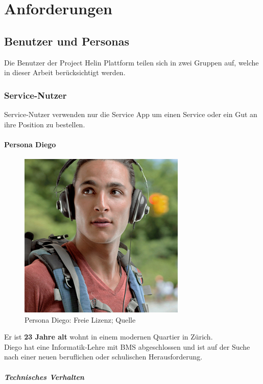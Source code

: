 \chapter{Anforderungen}

\section{Benutzer und Personas}


Die Benutzer der Project Helin Plattform teilen sich in zwei Gruppen auf, welche in dieser Arbeit berücksichtigt werden.

\subsection{Service-Nutzer}

Service-Nutzer verwenden nur die Service App um einen Service oder ein Gut an ihre Position zu bestellen. 

\subsubsection{Persona Diego}

\begin{figure}
\includegraphics[width=.35\textwidth]{images/persona-diego.jpg} 
\caption{Persona Diego: Freie Lizenz; Quelle }
\label{fig:diego}
\end{figure}

Er ist \textbf{23 Jahre alt} wohnt in einem modernen Quartier in Zürich.\\

Diego hat eine Informatik-Lehre mit BMS abgeschlossen und ist auf der Suche nach einer neuen beruflichen oder schulischen Herausforderung.

\paragraph{Technisches Verhalten} 

